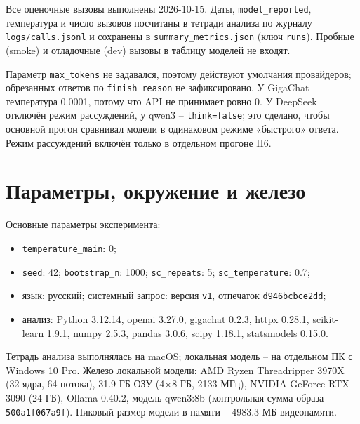 \documentclass{bmstu}
\begin{document}
\begin{table}[htbp]
\centering
\caption{Модели эксперимента и параметры вызовов}
\label{tab:models}
\setlength{\tabcolsep}{3pt}
\vspace{-10pt}
\end{table}

Все оценочные вызовы выполнены 2026-10-15. Даты, \texttt{model\_reported}, температура и число вызовов посчитаны в тетради анализа по журналу \texttt{logs/calls.jsonl} и сохранены в \texttt{summary\_metrics.json} (ключ \texttt{runs}). Пробные (smoke) и отладочные (dev) вызовы в таблицу моделей не входят.

Параметр \texttt{max\_tokens} не задавался, поэтому действуют умолчания провайдеров; обрезанных ответов по \texttt{finish\_reason} не зафиксировано. У GigaChat температура 0.0001, потому что API не принимает ровно 0. У DeepSeek отключён режим рассуждений, у qwen3 -- \texttt{think=false}; это сделано, чтобы основной прогон сравнивал модели в одинаковом режиме «быстрого» ответа. Режим рассуждений включён только в отдельном прогоне H6.

\section{Параметры, окружение и железо}
Основные параметры эксперимента:
\begin{itemize}[leftmargin=1.425\parindent, itemsep=0pt, topsep=-\parskip, wide=1.2cm]
\item \texttt{temperature\_main}: 0;
\item \texttt{seed}: 42; \texttt{bootstrap\_n}: 1000; \texttt{sc\_repeats}: 5; \texttt{sc\_temperature}: 0.7;
\item язык: русский; системный запрос: версия \texttt{v1}, отпечаток \texttt{d946bcbce2dd};
\item анализ: Python 3.12.14, openai 3.27.0, gigachat 0.2.3, httpx 0.28.1, scikit-learn 1.9.1, numpy 2.5.3, pandas 3.0.6, scipy 1.18.1, statsmodels 0.15.0.
\end{itemize}
Тетрадь анализа выполнялась на macOS; локальная модель -- на отдельном ПК с Windows 10 Pro. Железо локальной модели: AMD Ryzen Threadripper 3970X (32 ядра, 64 потока), 31.9 ГБ ОЗУ (4$\times$8 ГБ, 2133 МГц), NVIDIA GeForce RTX 3090 (24 ГБ), Ollama 0.40.2, модель qwen3:8b (контрольная сумма образа \texttt{500a1f067a9f}). Пиковый размер модели в памяти -- 4983.3 МБ видеопамяти.
\end{document}
